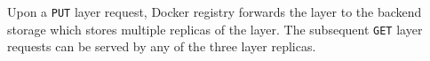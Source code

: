 Upon a \texttt{PUT} layer request, Docker registry forwards the layer to the
backend storage which stores multiple replicas of the layer.
%
The subsequent \texttt{GET} layer requests can be served by any of the three
layer replicas.
%


%
%
%
%
%
%
%
